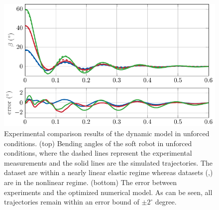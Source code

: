 %
\begin{figure}[!t]
  \centering
  \includegraphics*{./pdf/thesis-figure-4-16.pdf}
  \vspace{-1mm}
  \caption{Experimental comparison results of the
  dynamic model in unforced conditions. (top) Bending angles of the soft robot in unforced conditions,  where the dashed lines represent the experimental measurements and the solid lines are the simulated trajectories. The dataset  are within a nearly linear elastic regime whereas datasets (,) are in the nonlinear regime. (bottom) The error between experiments and the optimized numerical model. As can be seen, all trajectories remain within an error bound of $\pm2^\circ$ degree. }
  \label{fig:C2:compare_states}
\end{figure}
%

